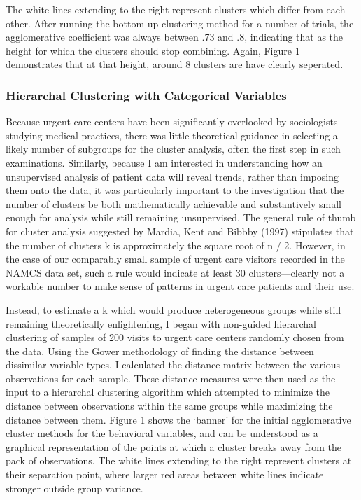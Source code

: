 \documentclass[12pt,twoside]{reedthesis}
\begin{document}
  The white lines extending to the right represent clusters which differ
  from each other. After running the bottom up clustering method for a
  number of trials, the agglomerative coefficient was always between .73
  and .8, indicating that as the height for which the clusters should stop
  combining. Again, Figure 1 demonstrates that at that height, around 8
  clusters are have clearly seperated.
  
  \subsubsection*{Hierarchal Clustering with Categorical
  Variables}\label{hierarchal-clustering-with-categorical-variables}
  
  Because urgent care centers have been significantly overlooked by
  sociologists studying medical practices, there was little theoretical
  guidance in selecting a likely number of subgroups for the cluster
  analysis, often the first step in such examinations. Similarly, because
  I am interested in understanding how an unsupervised analysis of patient
  data will reveal trends, rather than imposing them onto the data, it was
  particularly important to the investigation that the number of clusters
  be both mathematically achievable and substantively small enough for
  analysis while still remaining unsupervised. The general rule of thumb
  for cluster analysis suggested by Mardia, Kent and Bibbby (1997)
  stipulates that the number of clusters k is approximately the square
  root of n / 2. However, in the case of our comparably small sample of
  urgent care visitors recorded in the NAMCS data set, such a rule would
  indicate at least 30 clusters---clearly not a workable number to make
  sense of patterns in urgent care patients and their use.
  
  Instead, to estimate a k which would produce heterogeneous groups while
  still remaining theoretically enlightening, I began with non-guided
  hierarchal clustering of samples of 200 visits to urgent care centers
  randomly chosen from the data. Using the Gower methodology of finding
  the distance between dissimilar variable types, I calculated the
  distance matrix between the various observations for each sample. These
  distance measures were then used as the input to a hierarchal clustering
  algorithm which attempted to minimize the distance between observations
  within the same groups while maximizing the distance between them.
  Figure 1 shows the `banner' for the initial agglomerative cluster
  methods for the behavioral variables, and can be understood as a
  graphical representation of the points at which a cluster breaks away
  from the pack of observations. The white lines extending to the right
  represent clusters at their separation point, where larger red areas
  between white lines indicate stronger outside group variance.
  
\end{document}
